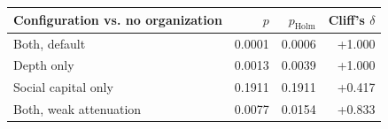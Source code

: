 \begin{tabular}{lrrr}
\toprule
Configuration vs. no organization & $p$ & $p_{\mathrm{Holm}}$ & Cliff's $\delta$ \\
\midrule
Both, default & 0.0001 & 0.0006 & +1.000 \\
Depth only & 0.0013 & 0.0039 & +1.000 \\
Social capital only & 0.1911 & 0.1911 & +0.417 \\
Both, weak attenuation & 0.0077 & 0.0154 & +0.833 \\
\bottomrule
\end{tabular}
